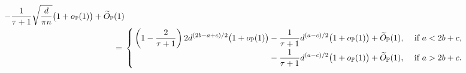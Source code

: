 \begin{lem}
\begin{enumerate}[label=(\alph*)]
\begin{equation*}
\begin{aligned}
            - \frac{1}{\tau + 1}\sqrt{\frac{d}{\pi n}}\bigl(1 + o_{\P}(1)\bigr) 
            + \wt O_\P(1) \\
            = {} & 
            \begin{cases} 
                \,  \displaystyle \left(1 - \frac{2}{\tau + 1}\right) 2d^{(2b-a+c)/2} \bigl(1 + o_{\P}(1)\bigr) 
                - \frac{1}{\tau + 1} d^{(a-c)/2} \bigl(1 + o_{\P}(1)\bigr) 
                + \wt O_\P(1) , & \ \text{if} \ a < 2b + c, \\
                \,  \displaystyle \phantom{\left(1 - \frac{2}{\tau + 1}\right) 2d^{(2b-a+c)/2} \bigl(1 + o_{\P}(1)\bigr) 
                }
                - \frac{1}{\tau + 1} d^{(a-c)/2} \bigl(1 + o_{\P}(1)\bigr) 
                + \wt O_\P(1) , & \ \text{if} \ a > 2b + c. \end{cases}
        \end{aligned}
    \end{equation*}
    \end{enumerate}
\end{lem}
